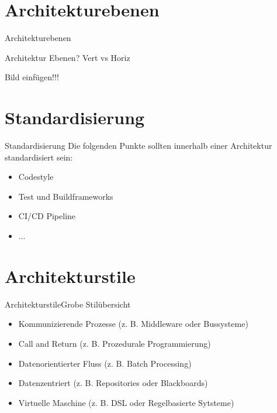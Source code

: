 \documentclass{beamer}
\begin{document}
\section{Architekturebenen}

\begin{frame}{Architekturebenen}

	Architektur Ebenen? Vert vs Horiz

	Bild einfügen!!!

\end{frame}

\section{Standardisierung}

\begin{frame}{Standardisierung}
	Die folgenden Punkte sollten innerhalb einer Architektur standardisiert sein:

	\begin{itemize}
		\item Codestyle
		\item Test und Buildframeworks
		\item CI/CD Pipeline
		\item ...
	\end{itemize}
\end{frame}

\section{Architekturstile}

\begin{frame}{Architekturstile}{Grobe Stilübersicht}
	\begin{itemize}
		\item Kommunizierende Prozesse (z. B. Middleware oder Bussysteme)
		\item Call and Return (z. B. Prozedurale Programmierung)
		\item Datenorientierter Fluss (z. B. Batch Processing)
		\item Datenzentriert (z. B. Repositories oder Blackboards)
		\item Virtuelle Maschine (z. B. DSL oder Regelbasierte Sytsteme)
	\end{itemize}




\end{frame}
\end{document}
